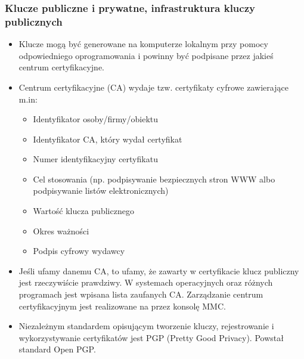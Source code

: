 \documentclass[../main.tex]{subfiles}
\begin{document}
    \subsubsection{Klucze publiczne i prywatne, infrastruktura kluczy publicznych}
    \begin{itemize}
        \item Klucze mogą być generowane na komputerze
        lokalnym przy pomocy odpowiedniego oprogramowania i powinny być podpisane przez
        jakieś centrum certyfikacyjne.
        \item Centrum certyfikacyjne (CA) wydaje tzw. certyfikaty cyfrowe zawierające m.in:
        \begin{itemize}
            \item Identyfikator osoby/firmy/obiektu
            \item Identyfikator CA, który wydał certyfikat
            \item Numer identyfikacyjny certyfikatu
            \item Cel stosowania (np. podpisywanie bezpiecznych stron WWW albo podpisywanie listów elektronicznych)
            \item Wartość klucza publicznego
            \item Okres ważności
            \item Podpis cyfrowy wydawcy
        \end{itemize}
        \item Jeśli ufamy danemu CA, to ufamy, że zawarty w certyfikacie klucz publiczny jest rzeczywiście prawdziwy.
        W systemach operacyjnych oraz różnych programach
        jest wpisana lista zaufanych CA.
        Zarządzanie centrum certyfikacyjnym jest realizowane na przez konsolę MMC.
        \item Niezależnym standardem opisującym tworzenie kluczy, rejestrowanie i wykorzystywanie
        certyfikatów jest PGP (Pretty Good Privacy). Powstał standard Open PGP.

    \end{itemize}
\end{document}

